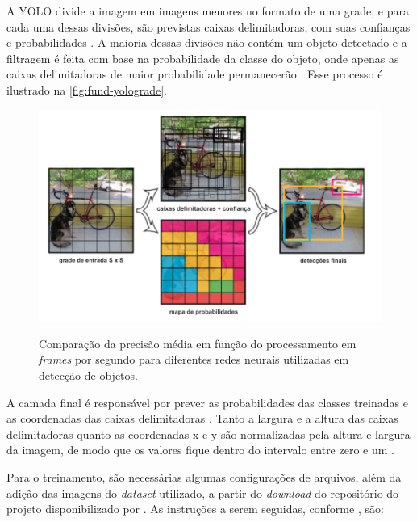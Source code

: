 A YOLO divide a imagem em imagens menores no formato de uma grade, e para cada uma dessas divisões, são previstas caixas delimitadoras, com suas confianças e probabilidades \cite{ref:Redmon-et-al}. A maioria dessas divisões não contém um objeto detectado e a filtragem é feita com base na probabilidade da classe do objeto, onde apenas as caixas delimitadoras de maior probabilidade permanecerão \cite{ref:Sivarajkumar}. Esse processo é ilustrado na \autoref{fig:fund-yolograde}.

\begin{figure}[h!] %
  \centering
  \caption{Comparação da precisão média em função do processamento em \textit{frames} por segundo para diferentes redes neurais utilizadas em detecção de objetos.}
  \includegraphics[scale=0.95]{img/img-fundamentacao-yolograde.pdf}
  \label{fig:fund-yolograde}
\end{figure}

A camada final é responsável por prever as probabilidades das classes treinadas e as coordenadas das caixas delimitadoras \cite{ref:Redmon-et-al}. Tanto a largura e a altura das caixas delimitadoras quanto as coordenadas x e y são normalizadas pela altura e largura da imagem, de modo que os valores fique dentro do intervalo entre zero e um \cite{ref:Redmon-et-al}.

Para o treinamento, são necessárias algumas configurações de arquivos, além da adição das imagens do \textit{dataset} utilizado, a partir do \textit{download} do repositório do projeto disponibilizado por . As instruções a serem seguidas, conforme , são:

